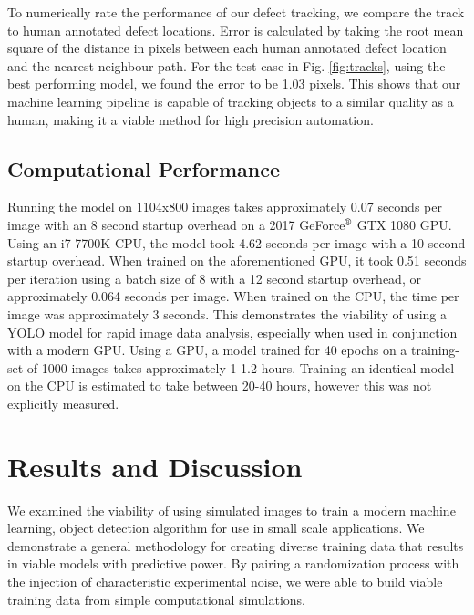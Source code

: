 \documentclass[twoside,twocolumn,9pt]{article}
\begin{document}
To numerically rate the performance of our defect tracking, we compare the track to human annotated defect locations. Error is calculated by taking the root mean square of the distance in pixels between each human annotated defect location and the nearest neighbour path. For the test case in Fig. \ref{fig:tracks}, using the best performing model, we found the error to be 1.03 pixels. This shows that our machine learning pipeline is capable of tracking objects to a similar quality as a human, making it a viable method for high precision automation.

\subsection{Computational Performance}

Running the model on 1104x800 images takes approximately 0.07 seconds per image with an 8 second startup overhead on a 2017 GeForce$^{\tiny{\text{\textregistered}}}$ GTX 1080 GPU. Using an i7-7700K CPU, the model took 4.62 seconds per image with a 10 second startup overhead. When trained on the aforementioned GPU, it took 0.51 seconds per iteration using a batch size of 8 with a 12 second startup overhead, or approximately 0.064 seconds per image. When trained on the CPU, the time per image was approximately 3 seconds.   %
This demonstrates the viability of using a YOLO model for rapid image data analysis, especially when used in conjunction with a modern GPU. Using a GPU, a model trained for 40 epochs on a training-set of 1000 images takes approximately 1-1.2 hours.
Training an identical model on the CPU is estimated to take between 20-40 hours, however this was not explicitly measured.

\section{Results and Discussion}
We examined the viability of using simulated images to train a modern machine learning, object detection algorithm for use in small scale applications. We demonstrate a general methodology for creating diverse training data that results in viable models with predictive power. By pairing a randomization process with the injection of characteristic experimental noise, we were able to build viable training data from simple computational simulations. 
\end{document}
